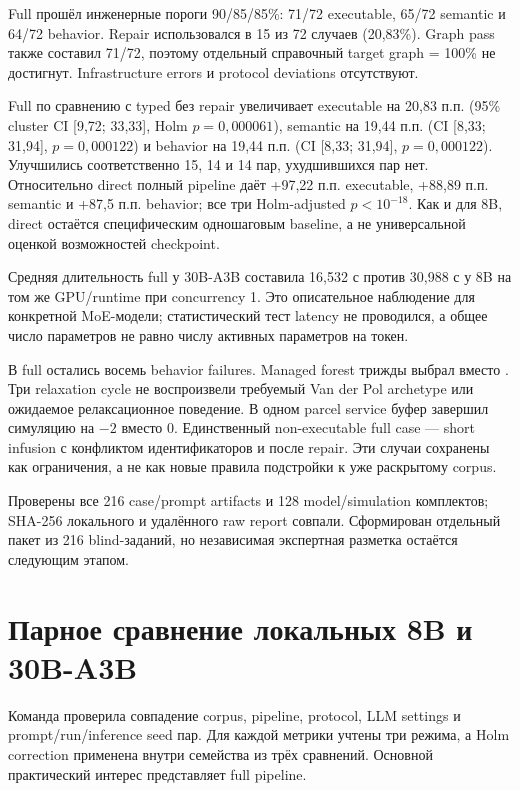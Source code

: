 Full прошёл инженерные пороги 90/85/85\%: 71/72 executable, 65/72 semantic и 64/72 behavior. Repair использовался в 15 из 72 случаев (20,83\%). Graph pass также составил 71/72, поэтому отдельный справочный target graph = 100\% не достигнут. Infrastructure errors и protocol deviations отсутствуют.

Full по сравнению с typed без repair увеличивает executable на 20,83 п.п. (95\% cluster CI [9,72; 33,33], Holm $p=0{,}000061$), semantic на 19,44 п.п. (CI [8,33; 31,94], $p=0{,}000122$) и behavior на 19,44 п.п. (CI [8,33; 31,94], $p=0{,}000122$). Улучшились соответственно 15, 14 и 14 пар, ухудшившихся пар нет. Относительно direct полный pipeline даёт +97,22 п.п. executable, +88,89 п.п. semantic и +87,5 п.п. behavior; все три Holm-adjusted $p<10^{-18}$. Как и для 8B, direct остаётся специфическим одношаговым baseline, а не универсальной оценкой возможностей checkpoint.

Средняя длительность full у 30B-A3B составила 16,532 с против 30,988 с у 8B на том же GPU/runtime при concurrency 1. Это описательное наблюдение для конкретной MoE-модели; статистический тест latency не проводился, а общее число параметров не равно числу активных параметров на токен.

В full остались восемь behavior failures. Managed forest трижды выбрал  вместо . Три relaxation cycle не воспроизвели требуемый Van der Pol archetype или ожидаемое релаксационное поведение. В одном parcel service буфер завершил симуляцию на $-2$ вместо 0. Единственный non-executable full case --- short infusion с конфликтом идентификаторов  и  после repair. Эти случаи сохранены как ограничения, а не как новые правила подстройки к уже раскрытому corpus.

Проверены все 216 case/\allowbreak prompt artifacts и 128 model/\allowbreak simulation комплектов; SHA-256 локального и удалённого raw report совпали. Сформирован отдельный пакет из 216 blind-заданий, но независимая экспертная разметка остаётся следующим этапом.

\section{Парное сравнение локальных 8B и 30B-A3B}

Команда   проверила совпадение corpus, pipeline, protocol, LLM settings и prompt/\allowbreak run/\allowbreak inference seed пар. Для каждой метрики учтены три режима, а Holm correction применена внутри семейства из трёх сравнений. Основной практический интерес представляет full pipeline.

